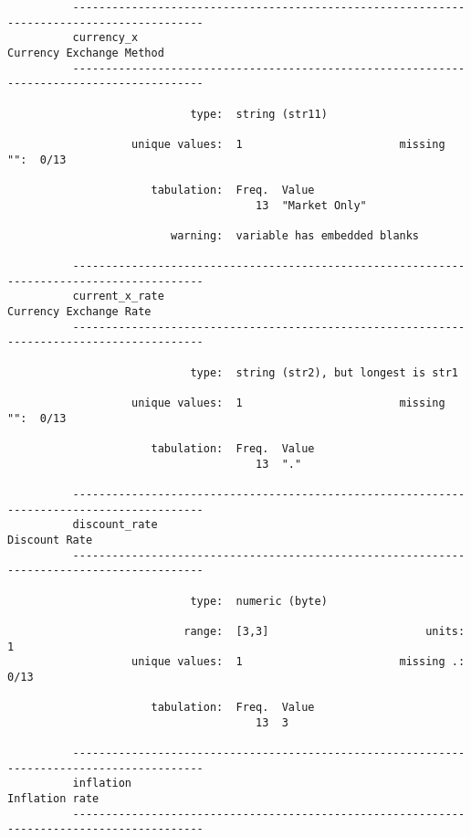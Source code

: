 \documentclass{article}
\begin{document}
\begin{verbatim}
          ------------------------------------------------------------------------------------------
          currency_x                                                        Currency Exchange Method
          ------------------------------------------------------------------------------------------
          
                            type:  string (str11)
          
                   unique values:  1                        missing "":  0/13
          
                      tabulation:  Freq.  Value
                                      13  "Market Only"
          
                         warning:  variable has embedded blanks
          
          ------------------------------------------------------------------------------------------
          current_x_rate                                                      Currency Exchange Rate
          ------------------------------------------------------------------------------------------
          
                            type:  string (str2), but longest is str1
          
                   unique values:  1                        missing "":  0/13
          
                      tabulation:  Freq.  Value
                                      13  "."
          
          ------------------------------------------------------------------------------------------
          discount_rate                                                                Discount Rate
          ------------------------------------------------------------------------------------------
          
                            type:  numeric (byte)
          
                           range:  [3,3]                        units:  1
                   unique values:  1                        missing .:  0/13
          
                      tabulation:  Freq.  Value
                                      13  3
          
          ------------------------------------------------------------------------------------------
          inflation                                                                   Inflation rate
          ------------------------------------------------------------------------------------------
          

\end{verbatim}
\end{document}
